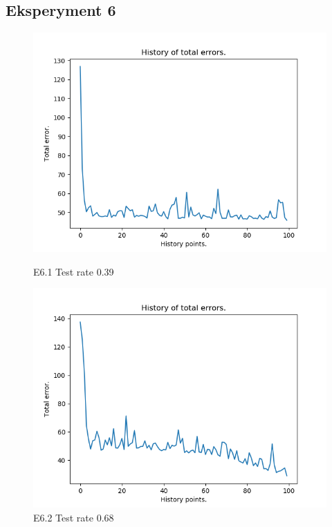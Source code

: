 \documentclass{classrep}
\begin{document}
	\subsection{Eksperyment 6}
		\begin{figure}[H]
			\begin{minipage}{0.5\linewidth}
				\centering
				\includegraphics[scale=0.25]{seeds_nn_m1.png}
				\caption{E6.1 Test rate  0.39}
			\end{minipage}
			\begin{minipage}{0.5\linewidth}
				\centering
				\includegraphics[scale=0.25]{seeds_nn_m5.png}
				\caption{E6.2 Test rate  0.68}
				\label{E6.2}
			\end{minipage}
			\begin{minipage}{0.5\linewidth}

\end{minipage}
\end{figure}
\end{document}
